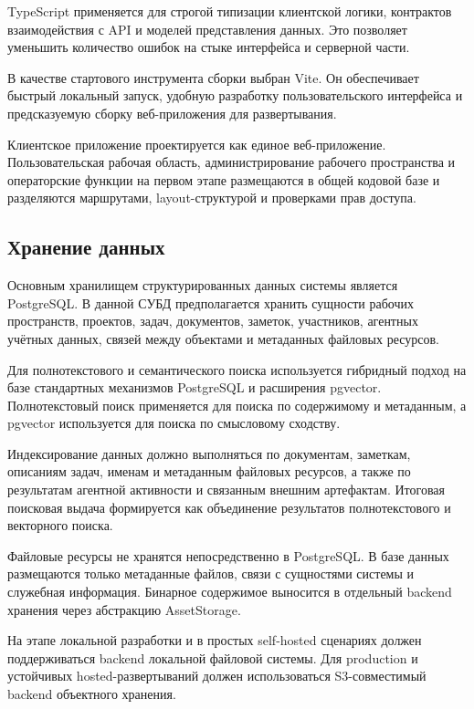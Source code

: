 TypeScript применяется для строгой типизации клиентской логики, контрактов взаимодействия с API и моделей представления данных. Это позволяет уменьшить количество ошибок на стыке интерфейса и серверной части.

В качестве стартового инструмента сборки выбран Vite. Он обеспечивает быстрый локальный запуск, удобную разработку пользовательского интерфейса и предсказуемую сборку веб-приложения для развертывания.

Клиентское приложение проектируется как единое веб-приложение. Пользовательская рабочая область, администрирование рабочего пространства и операторские функции на первом этапе размещаются в общей кодовой базе и разделяются маршрутами, layout-структурой и проверками прав доступа.

\textheadingsep
\subsection{Хранение данных}

\headingtextsep

Основным хранилищем структурированных данных системы является PostgreSQL. В данной СУБД предполагается хранить сущности рабочих пространств, проектов, задач, документов, заметок, участников, агентных учётных данных, связей между объектами и метаданных файловых ресурсов.

Для полнотекстового и семантического поиска используется гибридный подход на базе стандартных механизмов PostgreSQL и расширения pgvector. Полнотекстовый поиск применяется для поиска по содержимому и метаданным, а pgvector используется для поиска по смысловому сходству.

Индексирование данных должно выполняться по документам, заметкам, описаниям задач, именам и метаданным файловых ресурсов, а также по результатам агентной активности и связанным внешним артефактам. Итоговая поисковая выдача формируется как объединение результатов полнотекстового и векторного поиска.

Файловые ресурсы не хранятся непосредственно в PostgreSQL. В базе данных размещаются только метаданные файлов, связи с сущностями системы и служебная информация. Бинарное содержимое выносится в отдельный backend хранения через абстракцию AssetStorage.

На этапе локальной разработки и в простых self-hosted сценариях должен поддерживаться backend локальной файловой системы. Для production и устойчивых hosted-развертываний должен использоваться S3-совместимый backend объектного хранения.

